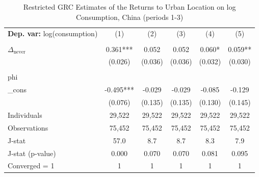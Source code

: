 \begin{table}[htbp] \centering \begin{threeparttable}
 \caption{Restricted GRC Estimates of the Returns to Urban Location on log Consumption, China (periods 1-3)} 
 \label{tab:GRC_CHN123_consumption_urban_unb} 
\begin{tabular}{l ccccc} \toprule  \textbf{Dep. var:}  log(consumption) 
                    &\multicolumn{1}{c}{(1)}   &\multicolumn{1}{c}{(2)}   &\multicolumn{1}{c}{(3)}   &\multicolumn{1}{c}{(4)}   &\multicolumn{1}{c}{(5)}   \\
                    &               &               &               &               &               \\
\addlinespace
$\Delta_{\text{never}}$&       0.361***&       0.052   &       0.052   &       0.060*  &       0.059** \\
                    &     (0.026)   &     (0.036)   &     (0.036)   &     (0.032)   &     (0.030)   \\
                    &               &               &               &               &               \\
\addlinespace
phi                 &               &               &               &               &               \\
_cons               &      -0.495***&      -0.029   &      -0.029   &      -0.085   &      -0.129   \\
                    &     (0.076)   &     (0.135)   &     (0.135)   &     (0.130)   &     (0.145)   \\
\addlinespace
Individuals         &      29,522   &      29,522   &      29,522   &      29,522   &      29,522   \\
Observations        &      75,452   &      75,452   &      75,452   &      75,452   &      75,452   \\
J-stat              &        57.0   &         8.7   &         8.7   &         8.3   &         7.9   \\
J-stat (p-value)    &       0.000   &       0.070   &       0.070   &       0.081   &       0.095   \\
Converged = 1       &           1   &           1   &           1   &           1   &           1   \\

\end{tabular}
\end{threeparttable}
\end{table}
